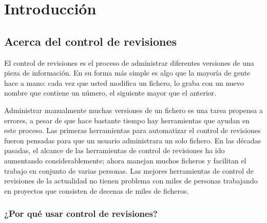 \chapter{Introducción}
\label{chap:intro}

\section{Acerca del control de revisiones}

El control de revisiones es el proceso de administrar diferentes
versiones de una pieza de información. En su forma más simple es algo
que la mayoría de gente hace a mano: cada vez que usted modifica un
fichero, lo graba con un nuevo nombre que contiene un número, el
siguiente mayor que el anterior.

Administrar manualmente muchas versiones de un fichero es una tarea
propensa a errores, a pesar de que hace bastante tiempo hay
herramientas que ayudan en este proceso.  Las primeras herramientas
para automatizar el control de revisiones fueron pensadas para que un
usuario administrara un solo fichero.  En las décadas pasadas, el
alcance de las herramientas de control de revisiones ha ido aumentando
considerablemente; ahora manejan muchos ficheros y facilitan el
trabajo en conjunto de varias personas. Las mejores herramientas de
control de revisiones de la actualidad no tienen problema con miles de
personas trabajando en proyectos que consisten de decenas de miles de
ficheros.

\subsection{¿Por qué usar control de revisiones?}

